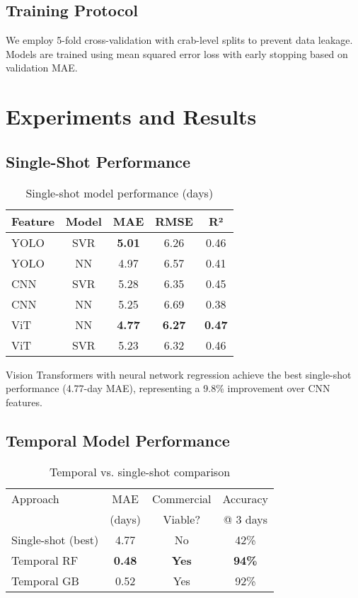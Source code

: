 \documentclass[10pt,twocolumn,letterpaper]{article}
\begin{document}
\subsection{Training Protocol}
We employ 5-fold cross-validation with crab-level splits to prevent data leakage. Models are trained using mean squared error loss with early stopping based on validation MAE.

\section{Experiments and Results}

\subsection{Single-Shot Performance}

\begin{table}[h]
\centering
\caption{Single-shot model performance (days)}
\begin{tabular}{lcccc}
\toprule
Feature & Model & MAE & RMSE & R² \\
\midrule
YOLO & SVR & \textbf{5.01} & 6.26 & 0.46 \\
YOLO & NN & 4.97 & 6.57 & 0.41 \\
CNN & SVR & 5.28 & 6.35 & 0.45 \\
CNN & NN & 5.25 & 6.69 & 0.38 \\
ViT & NN & \textbf{4.77} & \textbf{6.27} & \textbf{0.47} \\
ViT & SVR & 5.23 & 6.32 & 0.46 \\
\bottomrule
\end{tabular}
\end{table}

Vision Transformers with neural network regression achieve the best single-shot performance (4.77-day MAE), representing a 9.8\% improvement over CNN features.

\subsection{Temporal Model Performance}

\begin{table}[h]
\centering
\caption{Temporal vs. single-shot comparison}
\begin{tabular}{lccc}
\toprule
Approach & MAE & Commercial & Accuracy \\
 & (days) & Viable? & @ 3 days \\
\midrule
Single-shot (best) & 4.77 & No & 42\% \\
Temporal RF & \textbf{0.48} & \textbf{Yes} & \textbf{94\%} \\
Temporal GB & 0.52 & Yes & 92\% \\
\bottomrule
\end{tabular}
\end{table}
\end{document}
